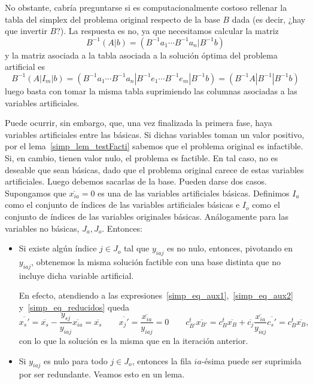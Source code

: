 No obstante, cabría preguntarse si es computacionalmente costoso rellenar la tabla del simplex del problema original respecto de la base $B$ dada (es decir, ¿hay que invertir $B$?). La respuesta es no, ya que necesitamos calcular la matriz
\begin{equation*}
	B^{-1}(A|b)=(B^{-1}a_1\cdots B^{-1}a_n|B^{-1}b)
\end{equation*}
y la matriz asociada a la tabla asociada a la solución óptima del problema artificial es
\begin{equation*}
	B^{-1}(A|I_m|b)=(B^{-1}a_1\cdots B^{-1}a_n|B^{-1}e_1\cdots B^{-1}e_m|B^{-1}b)=(B^{-1}A|B^{-1}|B^{-1}b)
\end{equation*}
luego basta con tomar la misma tabla suprimiendo las columnas asociadas a las variables artificiales.

Puede ocurrir, sin embargo, que, una vez finalizada la primera fase, haya variables artificiales entre las básicas. Si dichas variables toman un valor positivo, por el lema~\ref{simp_lem_testFacti} sabemos que el problema original es infactible. Si, en cambio, tienen valor nulo, el problema es factible. En tal caso, no es deseable que sean básicas, dado que el problema original carece de estas variables artificiales. Luego debemos sacarlas de la base. Pueden darse dos casos. Supongamos que $\overline{x_{ia}}=0$ es una de las variables artificiales básicas. Definimos $I_a$ como el conjunto de índices de las variables artificiales básicas e $I_o$ como el conjunto de índices de las variables originales básicas. Análogamente para las variables no básicas, $J_a, J_o$. Entonces:
\begin{itemize}
	\item Si existe algún índice $j\in J_o$ tal que $y_{iaj}$ es no nulo, entonces, pivotando en $y_{iaj}$, obtenemos la misma solución factible con una base distinta que no incluye dicha variable artificial.
	
	En efecto, atendiendo a las expresiones~\eqref{simp_eq_aux1},~\eqref{simp_eq_aux2} y~\eqref{simp_eq_reducidos} queda
	\begin{equation}
		\overline{x_s'}=\overline{x_s}-\frac{y_{sj}}{y_{iaj}}\overline{x_{ia}}=\overline{x_s} \qquad \overline{x_j'}=\frac{\overline{x_{ia}}}{y_{iaj}}=0 \qquad c^t_{B'}\overline{x_{B'}}=c^t_B\overline{x_B}+\overline{c_j}\frac{\overline{x_{ia}}}{y_{iaj}}\overline{c_s'}=c^t_B\overline{x_B},
	\end{equation}
	con lo que la solución es la misma que en la iteración anterior.
	
	\item Si $y_{iaj}$ es nulo para todo $j\in J_o$, entonces la fila $ia$-ésima puede ser suprimida por ser redundante. Veamos esto en un lema.
\end{itemize}
